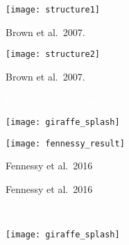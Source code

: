 \documentclass[t]{beamer}
\begin{document}
\begin{frame}[t]
\centering
\texttt{[image: structure1]}

\vfilll

\tinyfill Brown et al.~2007.

\end{frame}

\begin{frame}[t]
\centering
\texttt{[image: structure2]}

\vfill

\tinyfill Brown et al.~2007.

\end{frame}

{
\begin{frame}[t]{\textcolor{white}{\Huge But wait\dots \hfill there's more!}}

\vfilll

\texttt{[image: giraffe\_splash]}	
\end{frame}
}

\begin{frame}[t]
\centering
\texttt{[image: fennessy\_result]}


\vfill

\tinyfill Fennessy et al.~2016

\end{frame}

\begin{frame}

\vfill

\tinyfill Fennessy et al.~2016
\end{frame}

{
\begin{frame}[t]{\textcolor{white}{\Huge Does it matter?}}

\vfilll

\texttt{[image: giraffe\_splash]}	
\end{frame}
}
\end{document}
